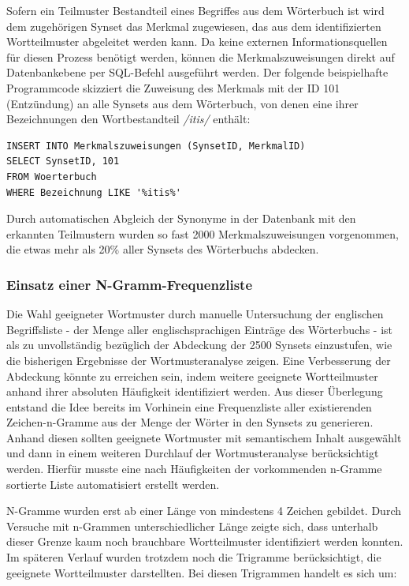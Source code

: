 \documentclass[pagesize,DIV=calc,12pt,final]{scrreprt}
\begin{document}
Sofern ein Teilmuster Bestandteil eines Begriffes aus dem Wörterbuch ist wird dem zugehörigen Synset das Merkmal zugewiesen, das aus dem identifizierten Wortteilmuster abgeleitet werden kann. 
Da keine externen Informationsquellen für diesen Prozess benötigt werden, können die Merkmalszuweisungen direkt auf Datenbankebene per SQL-Befehl ausgeführt werden. 
Der folgende beispielhafte Programmcode skizziert die Zuweisung des Merkmals mit der ID 101 (Entzündung) an alle Synsets aus dem Wörterbuch, von denen eine ihrer Bezeichnungen den Wortbestandteil \emph{/itis/} enthält: 

\lstset{
	numbers=left,
        language=SQL,
	basicstyle=\ttfamily\footnotesize,
	extendedchars=true,
	inputencoding=utf8,
	breaklines=true,
	breakindent=0pt,
}

\begin{lstlisting}
INSERT INTO Merkmalszuweisungen (SynsetID, MerkmalID) 
SELECT SynsetID, 101 
FROM Woerterbuch 
WHERE Bezeichnung LIKE '%itis%'
\end{lstlisting}

Durch automatischen Abgleich der Synonyme in der Datenbank mit den erkannten Teilmustern wurden so fast 2000 Merkmalszuweisungen vorgenommen, die etwas mehr als 20\% aller Synsets des Wörterbuchs abdecken. 

\subsubsection{Einsatz einer N-Gramm-Frequenzliste}

Die Wahl geeigneter Wortmuster durch manuelle Untersuchung der englischen Begriffsliste - der Menge aller englischsprachigen Einträge des Wörterbuchs - ist als zu unvollständig bezüglich der Abdeckung der 2500 Synsets einzustufen, wie die bisherigen Ergebnisse der Wortmusteranalyse zeigen. 
Eine Verbesserung der Abdeckung könnte zu erreichen sein, indem weitere geeignete Wortteilmuster anhand ihrer absoluten Häufigkeit identifiziert werden. 
Aus dieser Überlegung entstand die Idee bereits im Vorhinein eine Frequenzliste aller existierenden Zeichen-n-Gramme aus der Menge der Wörter in den Synsets zu generieren.
Anhand diesen sollten geeignete Wortmuster mit semantischem Inhalt ausgewählt und dann in einem weiteren Durchlauf der Wortmusteranalyse berücksichtigt werden. 
Hierfür musste eine nach Häufigkeiten der vorkommenden n-Gramme sortierte Liste automatisiert erstellt werden. 

N-Gramme wurden erst ab einer Länge von mindestens 4 Zeichen gebildet. 
Durch Versuche mit n-Grammen unterschiedlicher Länge zeigte sich, dass unterhalb dieser Grenze kaum noch brauchbare Wortteilmuster identifiziert werden konnten. 
Im späteren Verlauf wurden trotzdem noch die Trigramme berücksichtigt, die geeignete Wortteilmuster darstellten. 
Bei diesen Trigrammen handelt es sich um:
\end{document}
